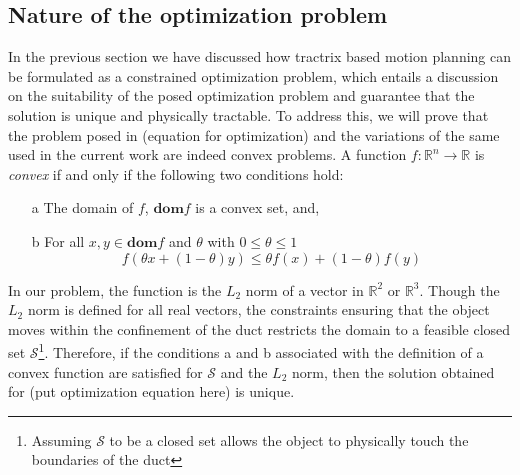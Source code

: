 \documentclass[12pt,a4]{article}
\begin{document}
\subsection{Nature of the optimization problem}\label{sc:optimization}
In the previous section we have discussed how tractrix based motion planning can be formulated as a constrained optimization problem, which entails a discussion on the suitability of the posed optimization problem and guarantee that the solution is unique and physically tractable. To address this, we will prove that the problem posed in (equation for optimization) and the variations of the same used in the current work are indeed convex problems. A function $f:\mathbb{R}^n\to \mathbb{R}$ is \textit{convex} if and only if the following two conditions hold:
\begin{enumerate}
	\item [a] The domain of $f$, $\textbf{dom}f$ is a convex set, and,
	\item [b]  For all $x,y \in \textbf{dom}f$ and $\theta$ with $0\leq \theta \leq 1$ \begin{equation}\label{eq:convex_fn}
	f(\theta x+(1-\theta)y)\leq \theta f(x)+(1-\theta)f(y)
	\end{equation}
\end{enumerate}
In our problem, the function is the $L_2$ norm of a vector in $\mathbb{R}^2$ or $\mathbb{R}^3$.  Though the $L_2$ norm is defined for all real vectors, the constraints ensuring that the object moves within the confinement of the duct restricts the domain to a feasible closed set $\mathcal{S}$\footnote{Assuming $\mathcal{S}$ to be a closed set allows the object to physically touch the boundaries of the duct}. Therefore, if the conditions a and b associated with the definition of a convex function are satisfied for $\mathcal{S}$ and the $L_2$ norm, then the solution obtained for (put optimization equation here) is unique. \\ 
\end{document}
